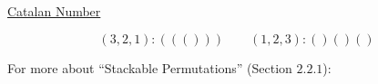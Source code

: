 \begin{frame}{}
  \begin{center}
    \resizebox{0.60\textwidth}{!}{}
  \end{center}
\end{frame}

\begin{frame}{}
  \begin{center}
    \resizebox{0.60\textwidth}{!}{}
  \end{center}
\end{frame}

\begin{frame}{}
  \centerline{\Large \href{https://en.wikipedia.org/wiki/Catalan\_number}{Catalan Number}}

  \[
    (3,2,1): ((())) \qquad (1,2,3): ()()()
  \]
\end{frame}

\begin{frame}{}
  \centerline{\Large For more about ``Stackable Permutations'' {\large (Section $2.2.1$)}:}

  \vspace{0.30cm}
  \begin{columns}
  \end{columns}
\end{frame}
